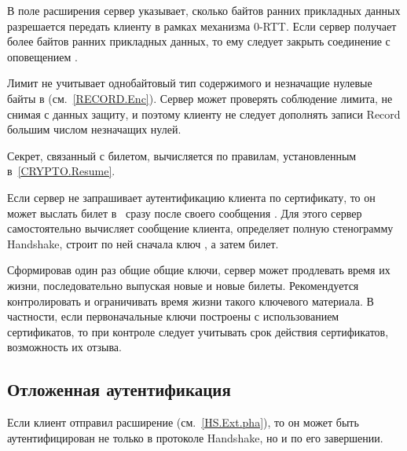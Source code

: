 В поле  расширения  
сервер указывает, сколько байтов ранних прикладных данных разрешается передать 
клиенту в рамках механизма \mbox{0-RTT}. 
%
Если сервер получает более  байтов ранних прикладных
данных, то ему следует закрыть соединение с оповещением
.

Лимит  не учитывает однобайтовый тип содержимого и 
незначащие нулевые байты в  (см.~\ref{RECORD.Enc}).
%
Сервер может проверять соблюдение лимита, не снимая с данных защиту, и поэтому 
клиенту не следует дополнять записи Record большим числом незначащих нулей.

Секрет, связанный с билетом, вычисляется по правилам, установленным 
в~\ref{CRYPTO.Resume}.

\begin{note}
Если сервер не запрашивает аутентификацию клиента по сертификату, то он может 
выслать билет в~ сразу после своего сообщения 
.
%
Для этого сервер самостоятельно вычисляет сообщение 
 клиента, определяет полную стенограмму Handshake, 
строит по ней сначала ключ , а затем билет.
\end{note}



\begin{note}
Сформировав один раз общие общие ключи, сервер может продлевать 
время их жизни, последовательно выпуская новые и новые билеты. 
Рекомендуется контролировать и ограничивать время жизни такого ключевого 
материала. 
%
В частности, если первоначальные ключи построены с использованием сертификатов, 
то при контроле следует учитывать срок действия сертификатов,  
возможность их отзыва. 
\end{note}

\subsection{Отложенная аутентификация}\label{HS.Post.Auth} 

Если клиент отправил расширение  
(см.~\ref{HS.Ext.pha}), то он может быть аутентифицирован не только в протоколе 
Handshake, но и по его завершении.

